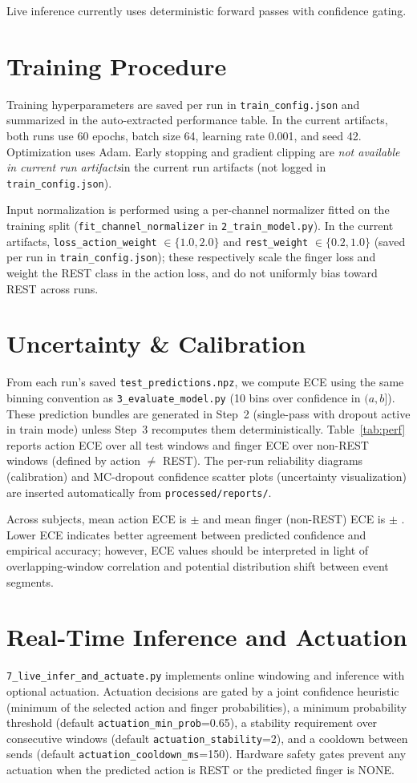 \documentclass[conference]{IEEEtran}
\newcommand{\NotAvailable}{\textit{not available in current run artifacts}}
\begin{document}
Live inference currently uses deterministic forward passes with confidence gating.

\section{Training Procedure}

Training hyperparameters are saved per run in \texttt{train\_config.json} and summarized in the auto-extracted performance table. In the current artifacts, both runs use 60 epochs, batch size 64, learning rate 0.001, and seed 42. Optimization uses Adam. Early stopping and gradient clipping are \NotAvailable in the current run artifacts (not logged in \texttt{train\_config.json}).

Input normalization is performed using a per-channel normalizer fitted on the training split (\texttt{fit\_channel\_normalizer} in \texttt{2\_train\_model.py}). In the current artifacts, \texttt{loss\_action\_weight} $\in \{1.0, 2.0\}$ and \texttt{rest\_weight} $\in \{0.2, 1.0\}$ (saved per run in \texttt{train\_config.json}); these respectively scale the finger loss and weight the REST class in the action loss, and do not uniformly bias toward REST across runs.

\section{Uncertainty \& Calibration}
From each run’s saved \texttt{test\_predictions.npz}, we compute ECE using the same binning convention as \texttt{3\_evaluate\_model.py} (10 bins over confidence in $(a,b]$). These prediction bundles are generated in Step~2 (single-pass with dropout active in train mode) unless Step~3 recomputes them deterministically. Table~\ref{tab:perf} reports action ECE over all test windows and finger ECE over non-REST windows (defined by action $\neq$ REST). The per-run reliability diagrams (calibration) and MC-dropout confidence scatter plots (uncertainty visualization) are inserted automatically from \texttt{processed/reports/}.

Across subjects, mean action ECE is \ActionECEMean $\pm$ \ActionECESD and mean finger (non-REST) ECE is \FingerECEMean $\pm$ \FingerECESD. Lower ECE indicates better agreement between predicted confidence and empirical accuracy; however, ECE values should be interpreted in light of overlapping-window correlation and potential distribution shift between event segments.

\section{Real-Time Inference and Actuation}
\texttt{7\_live\_infer\_and\_actuate.py} implements online windowing and inference with optional actuation. Actuation decisions are gated by a joint confidence heuristic (minimum of the selected action and finger probabilities), a minimum probability threshold (default \texttt{actuation\_min\_prob}=0.65), a stability requirement over consecutive windows (default \texttt{actuation\_stability}=2), and a cooldown between sends (default \texttt{actuation\_cooldown\_ms}=150). Hardware safety gates prevent any actuation when the predicted action is REST or the predicted finger is NONE.
\end{document}
